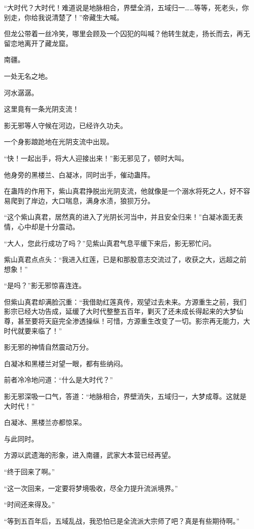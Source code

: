 \begin{this_body}
“大时代？大时代！难道说是地脉相合，界壁全消，五域归一……等等，死老头，你别走，你给我说清楚了！”帝藏生大喊。

但龙公带着一丝冷笑，哪里会顾及一个囚犯的叫喊？他转生就走，扬长而去，再无留恋地离开了藏龙窟。

南疆。

一处无名之地。

河水潺潺。

这里竟有一条光阴支流！

影无邪等人守候在河边，已经许久功夫。

一个身影踉跄地在光阴支流中出现。

“快！一起出手，将大人迎接出来！”影无邪见了，顿时大叫。

他身旁的黑楼兰、白凝冰，同时出手，催动蛊阵。

在蛊阵的作用下，紫山真君挣脱出光阴支流，他就像是一个溺水将死之人，好不容易爬到了岸边，大口喘息，满身水渍，狼狈万分。

“这个紫山真君，居然真的进入了光阴长河当中，并且安全归来！”白凝冰面无表情，心中却是十分震动。

“大人，您此行成功了吗？”见紫山真君气息平缓下来后，影无邪忙问。

紫山真君点点头：“我进入红莲，已是和那股意志交流过了，收获之大，远超之前想象！”

“是吗？”影无邪惊喜连连。

但紫山真君却满脸沉重：“我借助红莲真传，观望过去未来。方源重生之前，我们影宗已经大功告成，延缓了大时代整整五百年，剿灭了还未成长得起来的大梦仙尊，甚至要将天庭完全渗透操纵！可惜，方源重生改变了一切。影宗再无能力，大时代就要来临了！”

影无邪的神情自然震动万分。

白凝冰和黑楼兰对望一眼，都有些纳闷。

前者冷冷地问道：“什么是大时代？”

影无邪深吸一口气，答道：“地脉相合，界壁消失，五域归一，大梦成尊。这就是大时代！”

白凝冰、黑楼兰亦都惊呆。

与此同时。

方源以武遗海的形象，进入南疆，武家大本营已经再望。

“终于回来了啊。”

“这一次回来，一定要将梦境吸收，尽全力提升流派境界。”

“时间还来得及。”

“等到五百年后，五域乱战，我恐怕已是全流派大宗师了吧？真是有些期待啊。”

\end{this_body}

